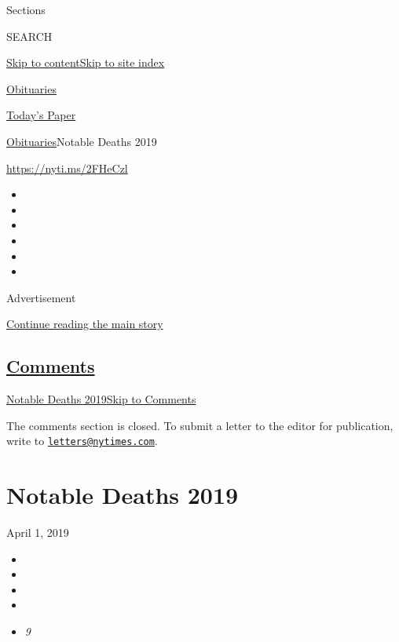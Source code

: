 Sections

SEARCH

\protect\hyperlink{site-content}{Skip to
content}\protect\hyperlink{site-index}{Skip to site index}

\href{https://www.nytimes.com/section/obituaries}{Obituaries}

\href{https://myaccount.nytimes.com/auth/login?response_type=cookie\&client_id=vi}{}

\href{https://www.nytimes.com/section/todayspaper}{Today's Paper}

\href{/section/obituaries}{Obituaries}\textbar{}Notable Deaths 2019

\url{https://nyti.ms/2FHeCzl}

\begin{itemize}
\item
\item
\item
\item
\item
\item
\end{itemize}

Advertisement

\protect\hyperlink{after-top}{Continue reading the main story}

\hypertarget{comments}{%
\subsection{\texorpdfstring{\protect\hyperlink{commentsContainer}{Comments}}{Comments}}\label{comments}}

\href{}{Notable Deaths 2019}\href{}{Skip to Comments}

The comments section is closed. To submit a letter to the editor for
publication, write to
\href{mailto:letters@nytimes.com}{\nolinkurl{letters@nytimes.com}}.

\hypertarget{notable-deaths-2019}{%
\section{Notable Deaths 2019}\label{notable-deaths-2019}}

April 1, 2019

\begin{itemize}
\item
\item
\item
\item
\item
  \emph{9}
\end{itemize}

